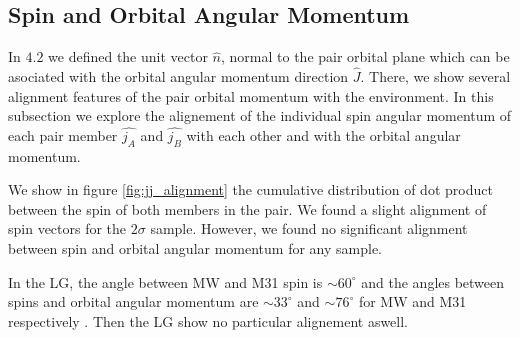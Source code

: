 \documentclass{emulateapj}
\begin{document}


\subsection{Spin and Orbital Angular Momentum}

In $4.2$ we defined the unit vector $\hat{n}$, normal to the pair 
orbital plane which can be asociated with the orbital angular 
momentum direction $\hat{J}$.
There, we show several alignment features of the pair orbital
momentum with the environment.
In this subsection we explore the alignement of the individual spin
angular momentum of each pair member $\hat{j_A}$ and $\hat{j_B}$ with
each other and with the orbital angular momentum.

We show in figure \ref{fig:jj_alignment} the cumulative distribution of
dot product between the spin of both members in the pair.
We found a slight alignment of spin vectors for the $2\sigma$ sample.
However, we found no significant alignment between spin and orbital angular 
momentum for any sample.

In the LG, the angle between MW and M31 spin is $\sim60^{\circ}$ and the
angles between spins and orbital angular momentum are $\sim33^{\circ}$
and $\sim76^{\circ}$ for MW and M31 respectively \citep{2012ApJ...753....9V}.
Then the LG show no particular alignement aswell. 
\end{document}
